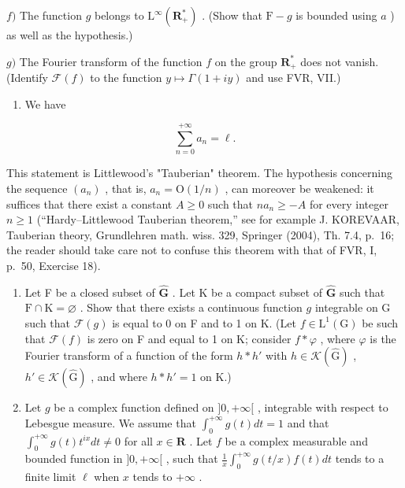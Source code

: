 \(f)\) The function \(g\) belongs to \(\mathrm{L}^{\infty}(\mathbf{R}_{+}^{*})\) . (Show that \(\mathrm{F}-g\) is bounded using \(a\) ) as well as the hypothesis.)

\(g)\) The Fourier transform of the function \(f\) on the group \(\mathbf{R}_{+}^{*}\) does not vanish. (Identify \(\mathcal{F}(f)\) to the function \(y\mapsto\Gamma(1+iy)\) and use FVR, VII.)

\begin{enumerate}
\def\labelenumi{\alph{enumi})}
\setcounter{enumi}{7}
\tightlist
\item
  We have
\end{enumerate}

\[
\sum_ {n = 0} ^ {+ \infty} a _ {n} = \ell .
\]

This statement is Littlewood's "Tauberian" theorem. The hypothesis concerning the sequence \((a_n)\) , that is, \(a_n = \mathrm{O}(1/n)\) , can moreover be weakened: it suffices that there exist a constant \(A \geqslant 0\) such that \(na_n \geqslant -A\) for every integer \(n \geqslant 1\) (“Hardy–Littlewood Tauberian theorem,” see for example J. KOREVAAR, Tauberian theory, Grundlehren math. wiss. 329, Springer (2004), Th. 7.4, p.~16; the reader should take care not to confuse this theorem with that of FVR, I, p.~50, Exercise 18).

\begin{enumerate}
\def\labelenumi{\arabic{enumi})}
\setcounter{enumi}{1}
\item
  Let F be a closed subset of \(\widehat{\mathbf{G}}\) . Let K be a compact subset of \(\widehat{\mathbf{G}}\) such that \(\mathrm{F} \cap \mathrm{K} = \varnothing\) . Show that there exists a continuous function \(g\) integrable on G such that \(\mathcal{F}(g)\) is equal to 0 on F and to 1 on K. (Let \(f \in \mathrm{L}^{1}(\mathrm{G})\) be such that \(\mathcal{F}(f)\) is zero on F and equal to 1 on K; consider \(f * \varphi\) , where \(\varphi\) is the Fourier transform of a function of the form \(h * h'\) with \(h \in \mathcal{K}(\widehat{\mathrm{G}})\) , \(h' \in \mathcal{K}(\widehat{\mathrm{G}})\) , and where \(h * h' = 1\) on K.)
\item
  Let \(g\) be a complex function defined on \(]0, +\infty[\) , integrable with respect to Lebesgue measure. We assume that \(\int_0^{+\infty} g(t)dt = 1\) and that \(\int_0^{+\infty} g(t)t^{ix}dt \neq 0\) for all \(x \in \mathbf{R}\) . Let \(f\) be a complex measurable and bounded function in \(]0, +\infty[\) , such that \(\frac{1}{x}\int_0^{+\infty} g(t/x)f(t)dt\) tends to a finite limit \(\ell\) when \(x\) tends to \(+\infty\) .
\end{enumerate}

